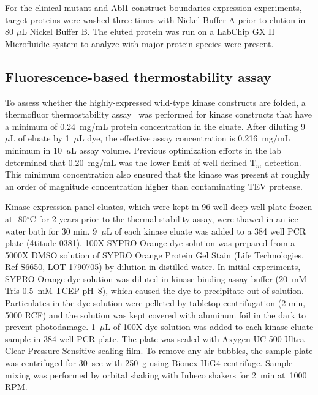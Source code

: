 \documentclass[phd,tocprelim]{cornell}
\begin{document}
For the clinical mutant and Abl1 construct boundaries expression experiments, target proteins were washed three times with Nickel Buffer A prior to elution in 80 $\mu$L Nickel Buffer B. The eluted protein was run on a LabChip GX II Microfluidic system to analyze with major protein species were present. 


\subsection{Fluorescence-based thermostability assay}

To assess whether the highly-expressed wild-type kinase constructs are folded, a thermofluor thermostability assay~\citep{Lo:2004gy,Ericsson:2006dx,Matulis:2005dq} was performed for kinase constructs that have a minimum of 0.24~mg/mL protein concentration in the eluate. After diluting 9~$\mu$L of eluate by 1~$\mu$L dye, the effective assay concentration is 0.216~mg/mL minimum in 10~$u$L assay volume. Previous optimization efforts in the lab determined that 0.20~mg/mL was the lower limit of well-defined T$_m$ detection. This minimum concentration also ensured that the kinase was present at roughly an order of magnitude concentration higher than contaminating TEV protease. 

Kinase expression panel eluates, which were kept in 96-well deep well plate frozen at -80$^{\circ}$C for 2 years prior to the thermal stability assay, were thawed in an ice-water bath for 30 min. 9~$\mu$L of each kinase eluate was added to a 384 well PCR plate (4titude-0381). 
100X SYPRO Orange dye solution was prepared from a 5000X DMSO solution of SYPRO Orange Protein Gel Stain (Life Technologies, Ref S6650, LOT 1790705) by dilution in distilled water. In initial experiments, SYPRO Orange dye solution was diluted in kinase binding assay buffer (20~mM Tris 0.5~mM TCEP pH~8), which caused the dye to precipitate out of solution. 
Particulates in the dye solution were pelleted by tabletop centrifugation (2 min, 5000 RCF) and the solution was kept covered with aluminum foil in the dark to prevent photodamage. 
1~$\mu$L of 100X dye solution was added to each kinase eluate sample in 384-well PCR plate. 
The plate was sealed with Axygen UC-500 Ultra Clear Pressure Sensitive sealing film. 
To remove any air bubbles, the sample plate was centrifuged for 30~sec with 250~g using Bionex HiG4 centrifuge. 
Sample mixing was performed by orbital shaking with Inheco shakers for 2~min at~1000 RPM.
\end{document}
